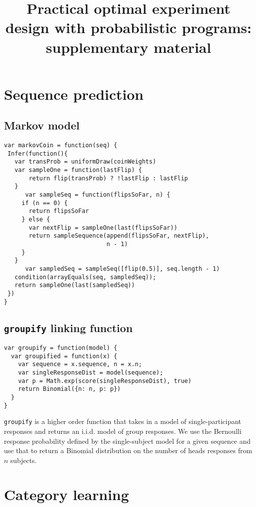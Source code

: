 \documentclass{article}
\title{Practical optimal experiment design with probabilistic programs: supplementary material}
\begin{document}

\maketitle

\section{Sequence prediction}

\subsection{Markov model}

\begin{lstlisting}[upquote=true]
var markovCoin = function(seq) {
 Infer(function(){
   var transProb = uniformDraw(coinWeights)
   var sampleOne = function(lastFlip) {
       return flip(transProb) ? !lastFlip : lastFlip
   }
	  var sampleSeq = function(flipsSoFar, n) {
     if (n == 0) {
       return flipsSoFar
     } else {
       var nextFlip = sampleOne(last(flipsSoFar))
       return sampleSequence(append(flipsSoFar, nextFlip),
                             n - 1)
     }
   }
	  var sampledSeq = sampleSeq([flip(0.5)], seq.length - 1)
   condition(arrayEquals(seq, sampledSeq));
   return sampleOne(last(sampledSeq))
 })
}
\end{lstlisting}

\subsection{\texttt{groupify} linking function}

\begin{lstlisting}[upquote=true]
var groupify = function(model) {
  var groupified = function(x) {
    var sequence = x.sequence, n = x.n;
    var singleResponseDist = model(sequence);
    var p = Math.exp(score(singleResponseDist), true)
    return Binomial({n: n, p: p})
  }
}
\end{lstlisting}

\lstinline{groupify} is a higher order function that takes in a model of single-participant responses and returns an i.i.d. model of group responses.
We use the Bernoulli response probability defined by the single-subject model for a given sequence and use that to return a Binomial distribution on the number of heads responses from $n$ subjects.

\section{Category learning}
\end{document}
